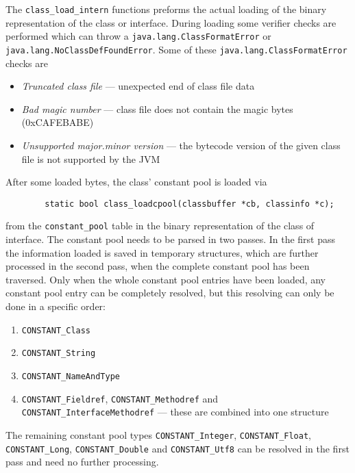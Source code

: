 The \texttt{class\_load\_intern} functions preforms the actual loading
of the binary representation of the class or interface. During loading
some verifier checks are performed which can throw a
\texttt{java.lang.ClassFormatError} or
\texttt{java.lang.NoClassDefFoundError}. Some of these
\texttt{java.lang.ClassFormatError} checks are

\begin{itemize}
 \item \textit{Truncated class file} --- unexpected end of class file
 data

 \item \textit{Bad magic number} --- class file does not contain the magic bytes
 (0xCAFEBABE)

 \item \textit{Unsupported major.minor version} --- the bytecode
 version of the given class file is not supported by the JVM
\end{itemize}

After some loaded bytes, the class' constant pool is loaded via

\begin{verbatim}
        static bool class_loadcpool(classbuffer *cb, classinfo *c);
\end{verbatim}

from the \texttt{constant\_pool} table in the binary representation of
the class of interface. The constant pool needs to be parsed in two
passes. In the first pass the information loaded is saved in temporary
structures, which are further processed in the second pass, when the
complete constant pool has been traversed. Only when the whole
constant pool entries have been loaded, any constant pool entry can be
completely resolved, but this resolving can only be done in a specific
order:

\begin{enumerate}
 \item \texttt{CONSTANT\_Class}

 \item \texttt{CONSTANT\_String}

 \item \texttt{CONSTANT\_NameAndType}

 \item \texttt{CONSTANT\_Fieldref}, \texttt{CONSTANT\_Methodref} and
 \texttt{CONSTANT\_InterfaceMethodref} --- these are combined into one
 structure
\end{enumerate}

The remaining constant pool types \texttt{CONSTANT\_Integer},
\texttt{CONSTANT\_Float}, \texttt{CONSTANT\_Long},
\texttt{CONSTANT\_Double} and \texttt{CONSTANT\_Utf8} can be resolved
in the first pass and need no further processing.

